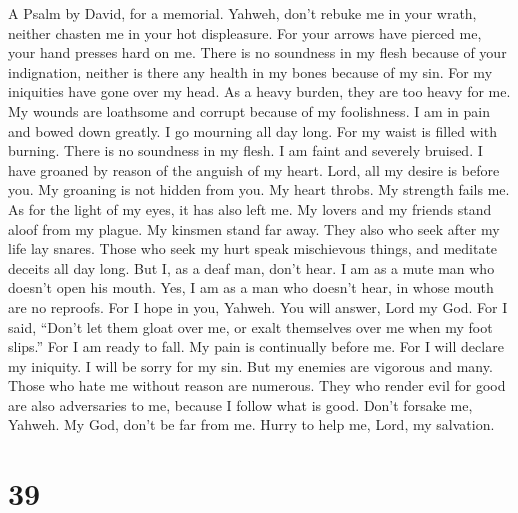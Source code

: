 A Psalm by David, for a memorial.  Yahweh, don't rebuke me
in your wrath, neither chasten me in your hot displeasure.
 For your arrows have pierced me, your hand presses hard
on me.  There is no soundness in my flesh because of your
indignation, neither is there any health in my bones because of my sin.
 For my iniquities have gone over my head. As a heavy
burden, they are too heavy for me.  My wounds are
loathsome and corrupt because of my foolishness.  I am in
pain and bowed down greatly. I go mourning all day long. 
For my waist is filled with burning. There is no soundness in my flesh.
 I am faint and severely bruised. I have groaned by reason
of the anguish of my heart.  Lord, all my desire is before
you. My groaning is not hidden from you.  My heart
throbs. My strength fails me. As for the light of my eyes, it has also
left me.  My lovers and my friends stand aloof from my
plague. My kinsmen stand far away.  They also who seek
after my life lay snares. Those who seek my hurt speak mischievous
things, and meditate deceits all day long.  But I, as a
deaf man, don't hear. I am as a mute man who doesn't open his mouth.
 Yes, I am as a man who doesn't hear, in whose mouth are
no reproofs.  For I hope in you, Yahweh. You will answer,
Lord my God.  For I said, ``Don't let them gloat over me,
or exalt themselves over me when my foot slips.''  For I
am ready to fall. My pain is continually before me.  For
I will declare my iniquity. I will be sorry for my sin. 
But my enemies are vigorous and many. Those who hate me without reason
are numerous.  They who render evil for good are also
adversaries to me, because I follow what is good.  Don't
forsake me, Yahweh. My God, don't be far from me.  Hurry
to help me, Lord, my salvation.

\hypertarget{section-38}{%
\section{39}\label{section-38}}

